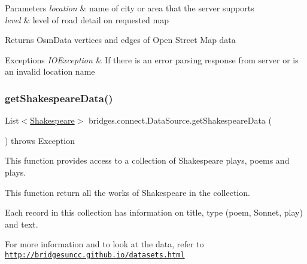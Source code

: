 \begin{DoxyParams}{Parameters}
{\em location} & name of city or area that the server supports \\
\hline
{\em level} & level of road detail on requested map \\
\hline
\end{DoxyParams}
\begin{DoxyReturn}{Returns}
Osm\+Data vertices and edges of Open Street Map data 
\end{DoxyReturn}

\begin{DoxyExceptions}{Exceptions}
{\em I\+O\+Exception} & If there is an error parsing response from server or is an invalid location name \\
\hline
\end{DoxyExceptions}
\mbox{\label{classbridges_1_1connect_1_1_data_source_af2b6e5df074d0a689e8a992b1bea6f3e}} 
\subsubsection{\texorpdfstring{get\+Shakespeare\+Data()}{getShakespeareData()}\hspace{0.1cm}{\footnotesize\ttfamily [1/3]}}
{\footnotesize\ttfamily List$<$\hyperlink{classbridges_1_1data__src__dependent_1_1_shakespeare}{Shakespeare}$>$ bridges.\+connect.\+Data\+Source.\+get\+Shakespeare\+Data (\begin{DoxyParamCaption}{ }\end{DoxyParamCaption}) throws Exception}



This function provides access to a collection of Shakespeare plays, poems and plays. 

This function return all the works of Shakespeare in the collection.

Each record in this collection has information on title, type (poem, Sonnet, play) and text.

For more information and to look at the data, refer to \href{http://bridgesuncc.github.io/datasets.html}{\tt http\+://bridgesuncc.\+github.\+io/datasets.\+html}


